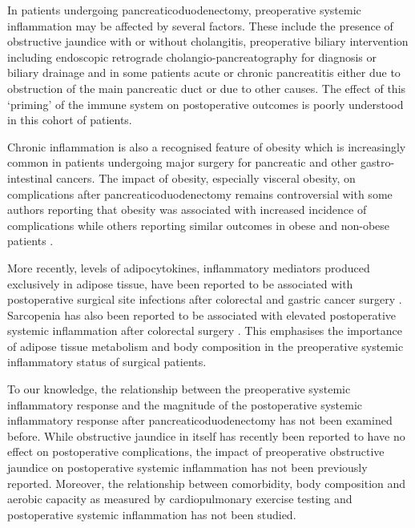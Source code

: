 In patients undergoing pancreaticoduodenectomy, preoperative systemic inflammation may be affected by several factors. 
These include the presence of obstructive jaundice with or without cholangitis, preoperative biliary intervention including endoscopic retrograde cholangio-pancreatography for diagnosis or biliary drainage and in some patients acute or chronic pancreatitis either due to obstruction of the main pancreatic duct or due to other causes. 
The effect of this `priming' of the immune system on postoperative outcomes is poorly understood in this cohort of patients. 

Chronic inflammation is also a recognised feature of obesity which is increasingly common in patients undergoing major surgery for pancreatic and other gastro-intestinal cancers. 
The impact of obesity, especially visceral obesity, on complications after pancreaticoduodenectomy remains controversial with some authors reporting that obesity was associated with increased incidence of complications \parencite{house_preoperative_2008, ramsey_body_2011} while others reporting similar outcomes in obese and non-obese patients \parencite{khan_does_2010, tsai_impact_2010, balentine_obesity_2011}. 

More recently, levels of adipocytokines, inflammatory mediators produced exclusively in adipose tissue, have been reported to be associated with postoperative surgical site infections after colorectal \parencite{ortega-deballon_preoperative_2013, matsuda_preoperative_2009} and gastric cancer surgery \parencite{yamamoto_association_2013}.
Sarcopenia has also been reported to be associated with elevated postoperative systemic inflammation after colorectal surgery \parencite{reisinger_sarcopenia_2015}.
This emphasises the importance of adipose tissue metabolism and body composition in the preoperative systemic inflammatory status of surgical patients. 

To our knowledge, the relationship between the preoperative systemic inflammatory response and the magnitude of the postoperative systemic inflammatory response after pancreaticoduodenectomy has not been examined before. 
While obstructive jaundice in itself has recently been reported to have no effect on postoperative complications, the impact of preoperative obstructive jaundice on postoperative systemic inflammation has not been previously reported. 
Moreover, the relationship between comorbidity, body composition and aerobic capacity as measured by cardiopulmonary exercise testing and postoperative systemic inflammation has not been studied. 

